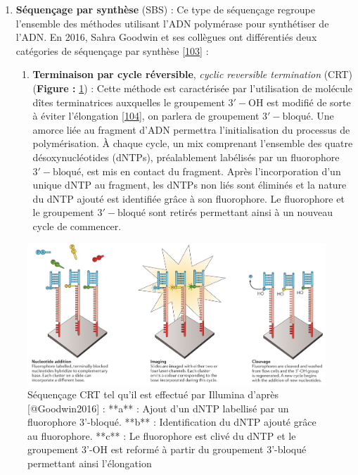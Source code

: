 \documentclass[12pt,twoside]{reedthesis}
\providecommand{\tightlist}{%
  \setlength{\itemsep}{0pt}\setlength{\parskip}{0pt}}
\theoremstyle{definition}
\theoremstyle{definition}
\theoremstyle{remark}
\begin{document}
  \begin{enumerate}
  \def\labelenumi{\arabic{enumi}.}
  \tightlist
  \item
    \textbf{Séquençage par synthèse} (SBS) : Ce type de séquençage
    regroupe l'ensemble des méthodes utilisant l'ADN polymérase pour
    synthétiser de l'ADN. En 2016, Sahra Goodwin et ses collègues ont
    différentiés deux catégories de séquençage par synthèse
    {[}\protect\hyperlink{ref-Goodwin2016}{103}{]} :
  
    \begin{enumerate}
    \def\labelenumii{\alph{enumii}.}
    \tightlist
    \item
      \textbf{Terminaison par cycle réversible}, \emph{cyclic reversible
      termination} (CRT) (\textbf{Figure : }\ref{fig:crtSeq}) : Cette
      méthode est caractérisée par l'utilisation de molécule dîtes
      terminatrices auxquelles le groupement \(\mathrm{3'-OH}\) est
      modifié de sorte à éviter l'élongation
      {[}\protect\hyperlink{ref-Guo2008}{104}{]}, on parlera de groupement
      \(\mathrm{3'-bloqué}\). Une amorce liée au fragment d'ADN permettra
      l'initialisation du processus de polymérisation. À chaque cycle, un
      mix comprenant l'ensemble des quatre désoxynucléotides (dNTPs),
      préalablement labélisés par un fluorophore \(\mathrm{3'-bloqué}\),
      est mis en contact du fragment. Après l'incorporation d'un unique
      dNTP au fragment, les dNTPs non liés sont éliminés et la nature du
      dNTP ajouté est identifiée grâce à son fluorophore. Le fluorophore
      et le groupement \(\mathrm{3'-bloqué}\) sont retirés permettant
      ainsi à un nouveau cycle de commencer.
    \end{enumerate}
  \end{enumerate}
  
  \begin{figure}
  
  {\centering \includegraphics[scale=.24]{figure/CRT_seq_illumina} 
  
  }
  
  \caption[Séquençage CRT tel qu'il est effectué par Illumina]{Séquençage CRT tel qu'il est effectué par Illumina d'après [@Goodwin2016] : **a** : Ajout d'un dNTP labellisé par un fluorophore 3'-bloqué. **b** : Identification du dNTP ajouté grâce au fluorophore. **c** : Le fluorophore est clivé du dNTP et le groupement 3'-OH est reformé à partir du groupement 3'-bloqué permettant ainsi l'élongation}\label{fig:crtSeq}
  \end{figure}
  
\end{document}
